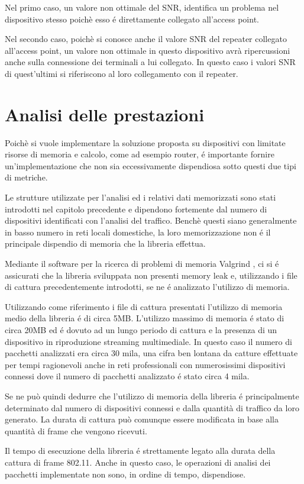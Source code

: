 Nel primo caso, un valore non ottimale del SNR, identifica un problema nel dispositivo stesso poich\`e esso \'e direttamente collegato all'access point.

Nel secondo caso, poich\`e si conosce anche il valore SNR del repeater collegato all'access point, un valore non ottimale in questo dispositivo avr\`a ripercussioni anche sulla connessione dei terminali a lui collegato.
In questo caso i valori SNR di quest'ultimi si riferiscono al loro collegamento con il repeater.




\section{Analisi delle prestazioni}

Poich\`e si vuole implementare la soluzione proposta su dispositivi con limitate risorse di memoria e calcolo, come ad esempio router, \'e importante fornire un'implementazione che non sia eccessivamente dispendiosa sotto questi due tipi di metriche.

Le strutture utilizzate per l'analisi ed i relativi dati memorizzati sono stati introdotti nel capitolo precedente e dipendono fortemente dal numero di dispositivi identificati con l'analisi del traffico.
Bench\`e questi siano generalmente in basso numero in reti locali domestiche, la loro memorizzazione non \'e il principale dispendio di memoria che la libreria effettua.

Mediante il software per la ricerca di problemi di memoria Valgrind \cite{valgrind}, ci si \'e assicurati che la libreria sviluppata non presenti memory leak e, utilizzando i file di cattura precedentemente introdotti, se ne \'e analizzato l'utilizzo di memoria.

Utilizzando come riferimento i file di cattura presentati l'utilizzo di memoria medio della libreria \'e di circa 5MB.
L'utilizzo massimo di memoria \'e stato di circa 20MB ed \'e dovuto ad un lungo periodo di cattura e la presenza di un dispositivo in riproduzione streaming multimediale.
In questo caso il numero di pacchetti analizzati era circa 30 mila, una cifra ben lontana da catture effettuate per tempi ragionevoli anche in reti professionali con numerosissimi dispositivi connessi dove il numero di pacchetti analizzato \'e stato circa 4 mila.

Se ne pu\`o quindi dedurre che l'utilizzo di memoria della libreria \'e principalmente determinato dal numero di dispositivi connessi e dalla quantit\`a di traffico da loro generato.
La durata di cattura pu\`o comunque essere modificata in base alla quantit\`a di frame che vengono ricevuti.

Il tempo di esecuzione della libreria \'e strettamente legato alla durata della cattura di frame 802.11.
Anche in questo caso, le operazioni di analisi dei pacchetti implementate non sono, in ordine di tempo, dispendiose.

